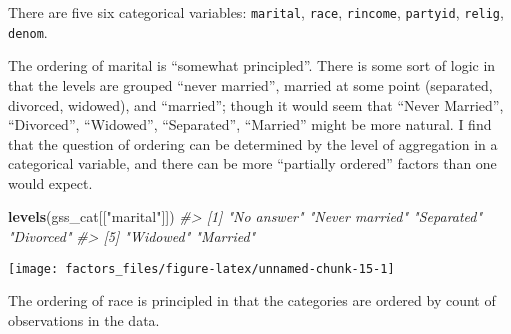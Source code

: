 \documentclass[]{book}
\newenvironment{Shaded}{\begin{snugshade}}{\end{snugshade}}
\newcommand{\CommentTok}[1]{\textcolor[rgb]{0.56,0.35,0.01}{\textit{#1}}}
\newcommand{\DataTypeTok}[1]{\textcolor[rgb]{0.13,0.29,0.53}{#1}}
\newcommand{\KeywordTok}[1]{\textcolor[rgb]{0.13,0.29,0.53}{\textbf{#1}}}
\newcommand{\NormalTok}[1]{#1}
\newcommand{\OperatorTok}[1]{\textcolor[rgb]{0.81,0.36,0.00}{\textbf{#1}}}
\newcommand{\OtherTok}[1]{\textcolor[rgb]{0.56,0.35,0.01}{#1}}
\newcommand{\StringTok}[1]{\textcolor[rgb]{0.31,0.60,0.02}{#1}}
\theoremstyle{definition}
\theoremstyle{definition}
\theoremstyle{definition}
\theoremstyle{remark}
\begin{document}
There are five six categorical variables: \texttt{marital},
\texttt{race}, \texttt{rincome}, \texttt{partyid}, \texttt{relig},
\texttt{denom}.

The ordering of marital is ``somewhat principled''. There is some sort
of logic in that the levels are grouped ``never married'', married at
some point (separated, divorced, widowed), and ``married''; though it
would seem that ``Never Married'', ``Divorced'', ``Widowed'',
``Separated'', ``Married'' might be more natural. I find that the
question of ordering can be determined by the level of aggregation in a
categorical variable, and there can be more ``partially ordered''
factors than one would expect.

\begin{Shaded}
\begin{Highlighting}[]
\KeywordTok{levels}\NormalTok{(gss_cat[[}\StringTok{"marital"}\NormalTok{]])}
\CommentTok{#> [1] "No answer"     "Never married" "Separated"     "Divorced"     }
\CommentTok{#> [5] "Widowed"       "Married"}
\end{Highlighting}
\end{Shaded}

\begin{Shaded}
\end{Shaded}

\begin{center}\texttt{[image: factors\_files/figure-latex/unnamed-chunk-15-1]} \end{center}

The ordering of race is principled in that the categories are ordered by
count of observations in the data.

\begin{Shaded}
\end{Shaded}

\begin{Shaded}
\end{Shaded}
\end{document}
